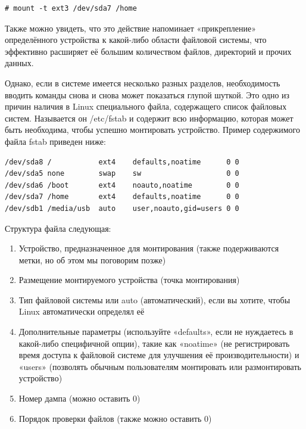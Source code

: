 \documentclass[10pt]{book}
\begin{document}
\vspace{3mm}
\begin{tcolorbox}
\begin{lstlisting}
# mount -t ext3 /dev/sda7 /home
\end{lstlisting}
\end{tcolorbox}

Также можно увидеть, что это действие напоминает «прикрепление» определённого устройства к какой-либо области файловой системы, что эффективно расширяет её большим количеством файлов, директорий и прочих данных.

Однако, если в системе имеется несколько разных разделов, необходимость вводить команды снова и снова может показаться глупой шуткой. Это одно из причин наличия в Linux специального файла, содержащего список файловых систем. Называется он /etc/fstab и содержит всю информацию, которая может быть необходима, чтобы успешно монтировать устройство. Пример содержимого файла fstab приведен ниже:

\vspace{3mm}
\begin{tcolorbox}
\begin{lstlisting}
/dev/sda8 /           ext4    defaults,noatime      0 0
/dev/sda5 none        swap    sw                    0 0
/dev/sda6 /boot       ext4    noauto,noatime        0 0
/dev/sda7 /home       ext4    defaults,noatime      0 0
/dev/sdb1 /media/usb  auto    user,noauto,gid=users 0 0
\end{lstlisting}
\end{tcolorbox}

Структура файла следующая:
\begin{enumerate}
  \item Устройство, предназначенное для монтирования (также подерживаются метки, но об этом мы поговорим позже)
  \item Размещение монтируемого устройства (точка монтирования)
  \item Тип файловой системы или auto (автоматический), если вы хотите, чтобы Linux автоматически определял её
  \item Дополнительные параметры (используйте «defaults», если не нуждаетесь в какой-либо специфичной опции), такие как «noatime» (не регистрировать время доступа к файловой системе для улучшения её производительности) и «users» (позволять обычным пользователям монтировать или размонтировать устройство)
  \item Номер дампа (можно оставить 0)
  \item Порядок проверки файлов (также можно оставить 0)
\end{enumerate}
\end{document}
